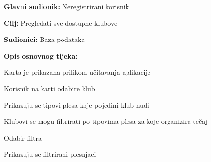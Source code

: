 					\noindent {}
					\begin{packed_item}
	
						\item \textbf{Glavni sudionik: }Neregistrirani korisnik
						\item  \textbf{Cilj:} Pregledati sve dostupne klubove
						\item  \textbf{Sudionici:} Baza podataka
						\item  \textbf{Opis osnovnog tijeka:						
						}
						
						\item[] \begin{packed_enum}
	
							\item Karta je prikazana prilikom učitavanja aplikacije
							\item Korisnik na karti odabire klub
							\item Prikazuju se tipovi plesa koje pojedini klub nudi
							\item Klubovi se mogu filtrirati po tipovima plesa za koje organizira 
tečaj
							\item Odabir filtra
							\item Prikazuju se filtrirani plesnjaci
							
						\end{packed_enum}
						
						
					\end{packed_item}
					
